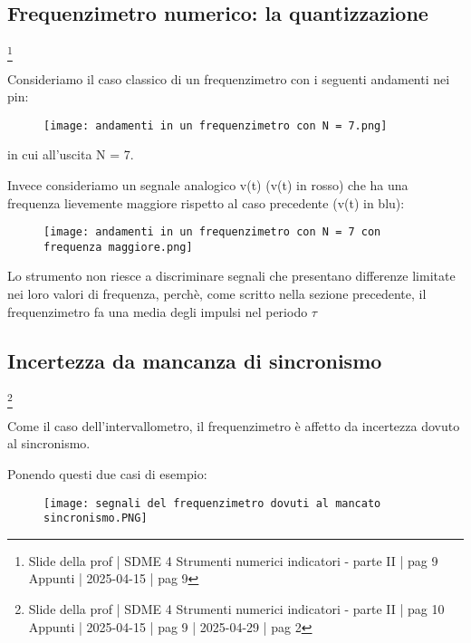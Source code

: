 \subsection{Frequenzimetro numerico: la quantizzazione}
\footnote{Slide della prof | SDME 4 Strumenti numerici indicatori - parte II | pag 9 \\  
Appunti | 2025-04-15 | pag 9}

Consideriamo il caso classico di un frequenzimetro con i seguenti andamenti nei pin: 

\begin{figure}[h]
    \centering
    \texttt{[image: andamenti in un frequenzimetro con N = 7.png]}
\end{figure}

in cui all'uscita N = 7. \newline 

Invece consideriamo un segnale analogico v(t) (v(t) in rosso) che ha una frequenza lievemente maggiore rispetto al caso precedente (v(t) in blu): 

\begin{figure}[h]
    \centering
    \texttt{[image: andamenti in un frequenzimetro con N = 7 con frequenza maggiore.png]}
\end{figure}

Lo strumento non riesce a discriminare segnali che presentano differenze limitate nei loro valori di frequenza, 
perchè, come scritto nella sezione precedente, il frequenzimetro fa una media degli impulsi nel periodo $\tau$ \newline

\newpage 

\subsection{Incertezza da mancanza di sincronismo}
\footnote{Slide della prof | SDME 4 Strumenti numerici indicatori - parte II | pag 10 \\  
Appunti | 2025-04-15 | pag 9 | 2025-04-29 | pag 2}

Come il caso dell'intervallometro, il frequenzimetro è affetto da incertezza dovuto al sincronismo. \newline 

Ponendo questi due casi di esempio: 

\begin{figure}[h]
    \centering
    \texttt{[image: segnali del frequenzimetro dovuti al mancato sincronismo.PNG]}
\end{figure}


